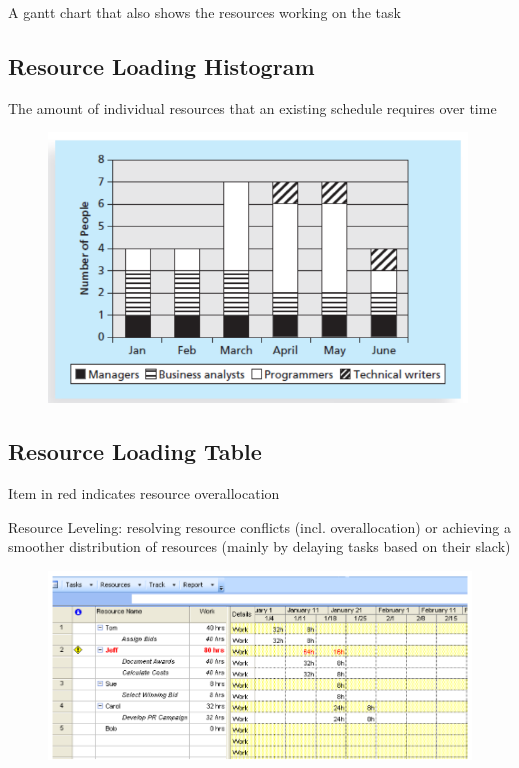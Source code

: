 \documentclass[]{project_plan}
\begin{document}
A gantt chart that also shows the resources working on the task

\newpage

\subsection{Resource Loading Histogram}
The amount of individual resources that an existing
schedule requires over time

\begin{figure}[h!]
  \centering
  \includegraphics[width=30em]{resource_loading_histogram.png}
\end{figure}

\subsection{Resource Loading Table}
Item in red indicates resource overallocation

Resource Leveling: resolving resource conflicts (incl. overallocation) or achieving a smoother distribution of
resources (mainly by delaying tasks based on their slack)

\begin{figure}[h!]
  \centering
  \includegraphics[width=\linewidth]{resource_loading_table.png}
\end{figure}
\end{document}
